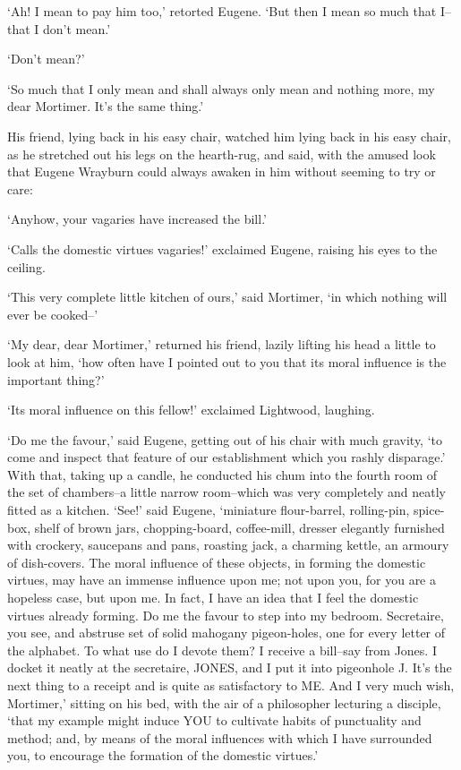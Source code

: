 ‘Ah! I mean to pay him too,’ retorted Eugene. ‘But then I mean so much
that I--that I don’t mean.’

‘Don’t mean?’

‘So much that I only mean and shall always only mean and nothing more,
my dear Mortimer. It’s the same thing.’

His friend, lying back in his easy chair, watched him lying back in his
easy chair, as he stretched out his legs on the hearth-rug, and said,
with the amused look that Eugene Wrayburn could always awaken in him
without seeming to try or care:

‘Anyhow, your vagaries have increased the bill.’

‘Calls the domestic virtues vagaries!’ exclaimed Eugene, raising his
eyes to the ceiling.

‘This very complete little kitchen of ours,’ said Mortimer, ‘in which
nothing will ever be cooked--’

‘My dear, dear Mortimer,’ returned his friend, lazily lifting his head
a little to look at him, ‘how often have I pointed out to you that its
moral influence is the important thing?’

‘Its moral influence on this fellow!’ exclaimed Lightwood, laughing.

‘Do me the favour,’ said Eugene, getting out of his chair with much
gravity, ‘to come and inspect that feature of our establishment which
you rashly disparage.’ With that, taking up a candle, he conducted
his chum into the fourth room of the set of chambers--a little narrow
room--which was very completely and neatly fitted as a kitchen. ‘See!’
said Eugene, ‘miniature flour-barrel, rolling-pin, spice-box, shelf of
brown jars, chopping-board, coffee-mill, dresser elegantly furnished
with crockery, saucepans and pans, roasting jack, a charming kettle, an
armoury of dish-covers. The moral influence of these objects, in forming
the domestic virtues, may have an immense influence upon me; not upon
you, for you are a hopeless case, but upon me. In fact, I have an idea
that I feel the domestic virtues already forming. Do me the favour to
step into my bedroom. Secretaire, you see, and abstruse set of solid
mahogany pigeon-holes, one for every letter of the alphabet. To what use
do I devote them? I receive a bill--say from Jones. I docket it neatly
at the secretaire, JONES, and I put it into pigeonhole J. It’s the next
thing to a receipt and is quite as satisfactory to ME. And I very much
wish, Mortimer,’ sitting on his bed, with the air of a philosopher
lecturing a disciple, ‘that my example might induce YOU to cultivate
habits of punctuality and method; and, by means of the moral influences
with which I have surrounded you, to encourage the formation of the
domestic virtues.’


